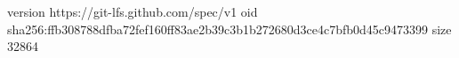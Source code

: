 version https://git-lfs.github.com/spec/v1
oid sha256:ffb308788dfba72fef160ff83ae2b39c3b1b272680d3ce4c7bfb0d45c9473399
size 32864
